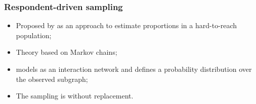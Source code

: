 \documentclass{beamer}
\newcommand{\Space}{\vspace{3ex}}
\begin{document}
\begin{frame}
  \frametitle{Respondent-driven sampling}
  
    \begin{itemize}
      \justifying
      \item<1> Proposed by \cite{heckathorn1997} as an approach to estimate
      proportions in a hard-to-reach population; 
  
      \Space
  
      \item<2> Theory based on Markov chains; 
      
      \Space
      
      \item<3> \cite{crawford2016} models as an interaction network and defines a probability distribution over the observed
      subgraph;
      
      \Space 
  
      \item<4> The sampling is without replacement. 
  
    \end{itemize}

\end{frame}
\end{document}

